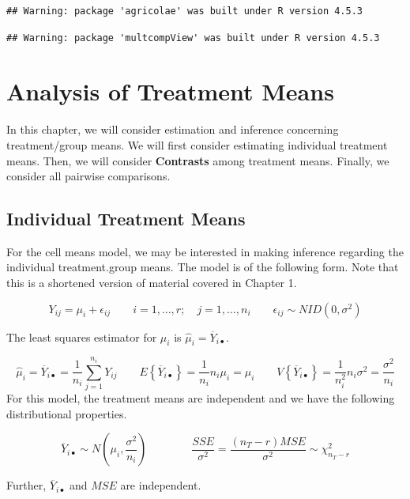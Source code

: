 \documentclass[
]{book}
\begin{document}
\begin{verbatim}
## Warning: package 'agricolae' was built under R version 4.5.3
\end{verbatim}

\begin{verbatim}
## Warning: package 'multcompView' was built under R version 4.5.3
\end{verbatim}

\chapter{Analysis of Treatment Means}\label{analysis-of-treatment-means}

In this chapter, we will consider estimation and inference concerning
treatment/group means. We will first consider estimating individual
treatment means. Then, we will consider \textbf{Contrasts} among
treatment means. Finally, we consider all pairwise comparisons.

\section{Individual Treatment Means}\label{individual-treatment-means}

For the cell means model, we may be interested in making inference
regarding the individual treatment.group means. The model is of the
following form. Note that this is a shortened version of material
covered in Chapter 1.

\[ 
Y_{ij}=\mu_i + \epsilon_{ij} 
\qquad i=1,\ldots,r; \quad j=1,\ldots, n_i \qquad \epsilon_{ij} \sim NID\left(0,\sigma^2\right) 
\]

The least squares estimator for \(\mu_i\) is
\(\hat{\mu}_i=\overline{Y}_{i\bullet}\).

\[
\hat{\mu}_i = \overline{Y}_{i\bullet} = \frac{1}{n_i}\sum_{j=1}^{n_i} Y_{ij} \qquad
E\left\{\overline{Y}_{i\bullet}\right\}=\frac{1}{n_i}n_i\mu_i = \mu_i \qquad
V\left\{\overline{Y}_{i\bullet}\right\}=\frac{1}{n_i^2}n_i\sigma^2=
\frac{\sigma^2}{n_i}
\] For this model, the treatment means are independent and we have the
following distributional properties.

\[
\overline{Y}_{i\bullet} \sim N\left(\mu_i,\frac{\sigma^2}{n_i}\right)
\qquad \qquad
\frac{SSE}{\sigma^2}=\frac{\left(n_T-r\right)MSE}{\sigma^2} \sim \chi_{n_T-r}^2
\]

Further, \(\overline{Y}_{i\bullet}\) and \(MSE\) are independent.
\end{document}
